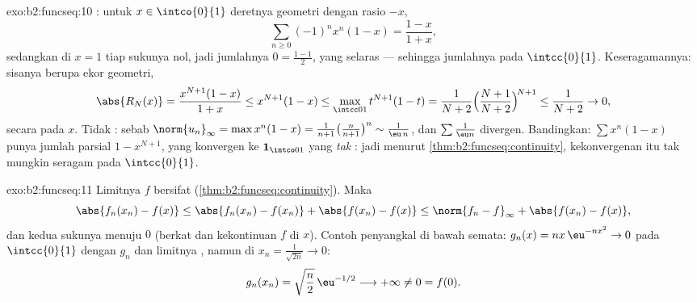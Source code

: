 \begin{solution}{exo:b2:funcseq:10}
: untuk $x \in \intco{0}{1}$ deretnya geometri dengan
rasio $-x$,
\[
\sum_{n\geq0}(-1)^n x^n(1-x) = \frac{1-x}{1+x},
\]
sedangkan di $x = 1$ tiap sukunya nol, jadi jumlahnya $0 =
\frac{1-1}{2}$, yang selaras --- sehingga jumlahnya  pada
$\intcc{0}{1}$. Keseragamannya: sisanya berupa ekor geometri,
\[
\abs{R_N(x)} = \frac{x^{N+1}(1-x)}{1+x} \leq x^{N+1}(1 - x)
\leq \max_{\intcc01} t^{N+1}(1-t)
= \frac{1}{N+2}\Bigl(\frac{N+1}{N+2}\Bigr)^{\!N+1}
\leq \frac{1}{N+2} \to 0 ,
\]
secara  pada $x$. Tidak : sebab $\norm{u_n}_\infty =
\max x^n(1-x) = \frac{1}{n+1}\bigl(\frac{n}{n+1}\bigr)^n \sim
\frac{1}{\eu\,n}$, dan $\sum \frac1{\eu n}$ divergen. Bandingkan:
$\sum x^n(1-x)$ punya jumlah parsial $1 - x^{N+1}$, yang konvergen
 ke $\mathbf 1_{\intco01}$ yang \emph{tak }: jadi
menurut \cref{thm:b2:funcseq:continuity}, kekonvergenan itu tak mungkin
seragam pada $\intcc{0}{1}$.
\end{solution}

\begin{solution}{exo:b2:funcseq:11}
Limitnya $f$ bersifat  (\cref{thm:b2:funcseq:continuity}).
Maka
\[
\abs{f_n(x_n) - f(x)}
\leq \abs{f_n(x_n) - f(x_n)} + \abs{f(x_n) - f(x)}
\leq \norm{f_n - f}_\infty + \abs{f(x_n) - f(x)} ,
\]
dan kedua sukunya menuju $0$ (berkat  dan
kekontinuan $f$ di $x$). Contoh penyangkal di bawah  semata: $g_n(x) = nx\,\eu^{-nx^2} \to 0$  pada
$\intcc{0}{1}$ dengan $g_n$ dan limitnya , namun di $x_n =
\frac{1}{\sqrt{2n}} \to 0$:
\[
g_n(x_n) = \sqrt{\frac n2}\,\eu^{-1/2} \longrightarrow +\infty
\neq 0 = f(0) .
\]
\end{solution}


